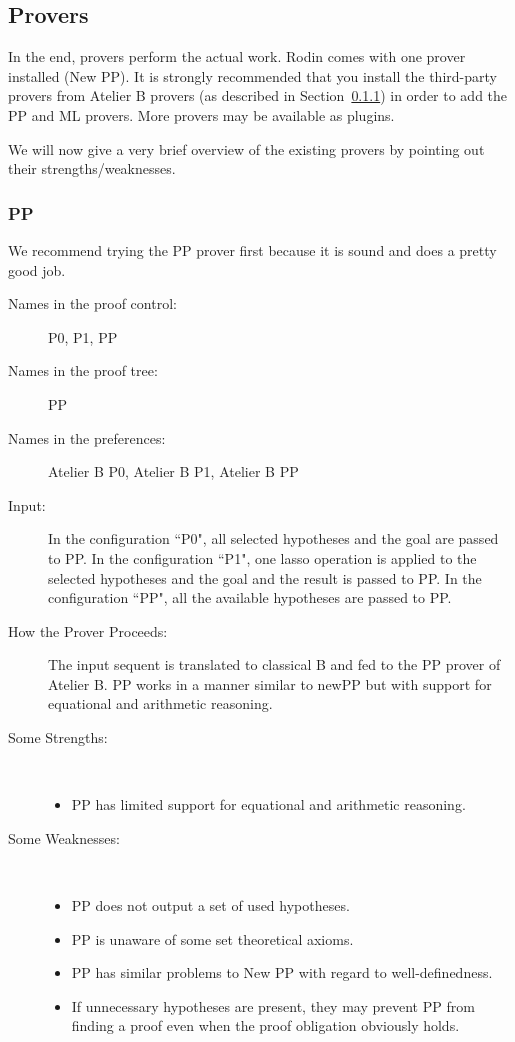 \subsection{Provers}
\label{atelier_b_provers}

In the end, provers perform the actual work.  Rodin comes with one prover installed (New PP).  It is strongly recommended that you install the third-party provers from Atelier B provers (as described in Section~\ref{}) in order to add the PP and ML provers.  More provers may be available as plugins.

We will now give a very brief overview of the existing provers by pointing out their strengths/weaknesses.

\subsubsection{PP}

We recommend trying the PP prover first because it is sound and does a pretty good job.

\begin{description}
	\item[Names in the proof control:]  P0, P1, PP
	\item[Names in the proof tree:] PP
	\item[Names in the preferences:] Atelier B P0, Atelier B P1, Atelier B PP
	\item[Input:] In the configuration ``P0", all selected hypotheses and the goal are passed to PP. In the configuration ``P1", one lasso operation is applied to the selected hypotheses and the goal and the result is passed to PP. In the configuration ``PP", all the available hypotheses are passed to PP.
	\item[How the Prover Proceeds:] The input sequent is translated to classical B and fed to the PP prover of Atelier B. PP works in a manner similar to newPP but with support for equational and arithmetic reasoning.
	\item[Some Strengths:] ~
	\begin{itemize}
		\item PP has limited support for equational and arithmetic reasoning. 
	\end{itemize}
	\item[Some Weaknesses:] ~
\begin{itemize}
	\item PP does not output a set of used hypotheses.
	\item PP is unaware of some set theoretical axioms.
	\item PP has similar problems to New PP with regard to well-definedness.
	\item If unnecessary hypotheses are present, they may prevent PP from finding a proof even when the proof obligation obviously holds. 
\end{itemize}
\end{description}

